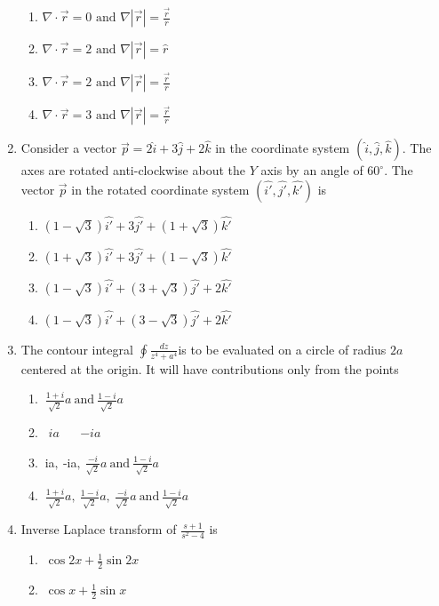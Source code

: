 \documentclass[journal]{IEEEtran}
\begin{document}
\begin{enumerate}
\begin{enumerate}
\item $\nabla \cdot \vec{r} = 0 \text{ and } \nabla |\vec{r}| = \frac{\vec{r}}{r}$

\item $\nabla \cdot \vec{r} = 2 \text{ and } \nabla |\vec{r}| = \hat{r}$

\item $\nabla \cdot \vec{r} = 2 \text{ and } \nabla |\vec{r}| = \frac{\vec{r}}{r}$

\item $\nabla \cdot \vec{r} = 3 \text{ and } \nabla |\vec{r}| = \frac{\vec{r}}{r}$
\end{enumerate}
\item Consider a vector $\vec{p} = 2\hat{i} + 3\hat{j} + 2\hat{k}$ in the coordinate system $(\hat{i}, \hat{j}, \hat{k})$. The axes are rotated anti-clockwise about the $Y$ axis by an angle of $60^\circ$. The vector $\vec{p}$ in the rotated coordinate system $(\hat{i'}, \hat{j'}, \hat{k'})$ is

\begin{enumerate}
\item $(1-\sqrt{3})\hat{i'} + 3\hat{j'} + (1+\sqrt{3})\hat{k'}$

\item $(1+\sqrt{3})\hat{i'} + 3\hat{j'} + (1-\sqrt{3})\hat{k'}$

\item $(1-\sqrt{3})\hat{i'} + (3+\sqrt{3})\hat{j'} + 2\hat{k'}$


\item $(1-\sqrt{3})\hat{i'} + (3-\sqrt{3})\hat{j'} + 2\hat{k'}$
\end{enumerate}
\item The contour integral \( \oint \frac{dz}{z^4 + a^4} \)is to be evaluated on a circle of radius $2a$ centered at the origin. It will have contributions only from the points
\begin{enumerate}
\item $\ \frac{1+i}{\sqrt{2}}a \ \text{and} \ \frac{1-i}{\sqrt{2}}a$

\item  \ $ia$ \  \ $-ia$
\item $ \ $ia$, \ $-ia$, \ \frac{-i}{\sqrt{2}}a \ \text{and} \ \frac{1-i}{\sqrt{2}}a$
\item $ \ \frac{1+i}{\sqrt{2}}a, \ \frac{1-i}{\sqrt{2}}a, \ \frac{-i}{\sqrt{2}}a \ \text{and} \ \frac{1-i}{\sqrt{2}}a$
\end{enumerate}
\item Inverse Laplace transform of \( \frac{s+1}{s^2 - 4}\) is
\begin{enumerate}
\item $\ \cos 2x + \frac{1}{2}\sin 2x$
\item $ \ \cos x + \frac{1}{2}\sin x$


\end{enumerate}
\end{enumerate}
\end{document}
